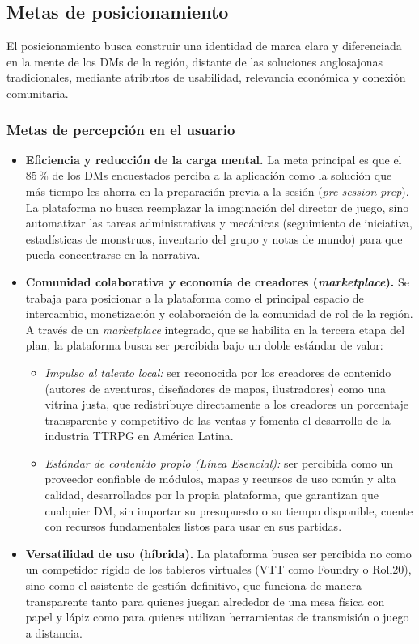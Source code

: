 \subsection{Metas de posicionamiento}
El posicionamiento busca construir una identidad de marca clara y diferenciada en la mente de los DMs de la región, distante de las soluciones anglosajonas tradicionales, mediante atributos de usabilidad, relevancia económica y conexión comunitaria.

\subsubsection{Metas de percepción en el usuario}
\begin{itemize}
  \item \textbf{Eficiencia y reducción de la carga mental.} La meta principal es que el 85\,\% de los DMs encuestados perciba a la aplicación como la solución que más tiempo les ahorra en la preparación previa a la sesión (\textit{pre-session prep}). La plataforma no busca reemplazar la imaginación del director de juego, sino automatizar las tareas administrativas y mecánicas (seguimiento de iniciativa, estadísticas de monstruos, inventario del grupo y notas de mundo) para que pueda concentrarse en la narrativa.
  \item \textbf{Comunidad colaborativa y economía de creadores (\textit{marketplace}).} Se trabaja para posicionar a la plataforma como el principal espacio de intercambio, monetización y colaboración de la comunidad de rol de la región. A través de un \textit{marketplace} integrado, que se habilita en la tercera etapa del plan, la plataforma busca ser percibida bajo un doble estándar de valor:
  \begin{itemize}
    \item \emph{Impulso al talento local:} ser reconocida por los creadores de contenido (autores de aventuras, diseñadores de mapas, ilustradores) como una vitrina justa, que redistribuye directamente a los creadores un porcentaje transparente y competitivo de las ventas y fomenta el desarrollo de la industria TTRPG en América Latina.
    \item \emph{Estándar de contenido propio (Línea Esencial):} ser percibida como un proveedor confiable de módulos, mapas y recursos de uso común y alta calidad, desarrollados por la propia plataforma, que garantizan que cualquier DM, sin importar su presupuesto o su tiempo disponible, cuente con recursos fundamentales listos para usar en sus partidas.
  \end{itemize}
  \item \textbf{Versatilidad de uso (híbrida).} La plataforma busca ser percibida no como un competidor rígido de los tableros virtuales (VTT como Foundry o Roll20), sino como el asistente de gestión definitivo, que funciona de manera transparente tanto para quienes juegan alrededor de una mesa física con papel y lápiz como para quienes utilizan herramientas de transmisión o juego a distancia.
\end{itemize}

